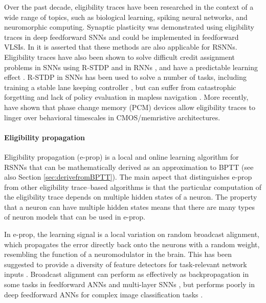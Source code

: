 Over the past decade, eligibility traces have been researched in the context of a wide range of topics, such as biological learning, spiking neural networks, and neuromorphic computing.
Synaptic plasticity was demonstrated using eligibility traces in deep feedforward SNNs \citep{zenke2018superspike,neftci2017event,kaiser2020synaptic} and could be implemented in feedforward VLSIs.
In \citet{zenke2018superspike} it is asserted that these methods are also applicable for RSNNs.
Eligibility traces have also been shown to solve difficult credit assignment problems in SNNs using R-STDP \citep{legenstein2008learning, bellec2020solution} and in RNNs \citep{he2015distinct}, and have a predictable learning effect \citep{legenstein2008learning}.
R-STDP in SNNs has been used to solve a number of tasks, including training a stable lane keeping controller \citep{bing2020indirect}, but can suffer from catastrophic forgetting and lack of policy evaluation in mapless navigation \citep{bing2018end}.
More recently, \citet{demirag2021pcm} have shown that phase change memory (PCM) devices allow eligibility traces to linger over behavioral timescales in CMOS/memristive architectures.

\paragraph{Eligibility propagation}
Eligibility propagation (e-prop) \citep{bellec2020solution} is a local and online learning algorithm for RSNNs that can be mathematically derived as an approximation to BPTT (see also Section \ref{sec:derivefromBPTT}).
The main aspect that distinguishes e-prop from other eligibility trace--based algorithms is that the particular computation of the eligibility trace depends on multiple hidden states of a neuron.
The property that a neuron can have multiple hidden states means that there are many types of neuron models that can be used in e-prop.

In e-prop, the learning signal is a local variation on random broadcast alignment, which propagates the error directly back onto the neurons with a random weight, resembling the function of a neuromodulator in the brain.
This has been suggested to provide a diversity of feature detectors for task-relevant network inputs \citep{bellec2020solution}.
Broadcast alignment can perform as effectively as backpropagation in some tasks in feedforward ANNs \citep{lillicrap2016random,nokland2016direct} and multi-layer SNNs \citep{samadi2017deep,clopath2010connectivity}, but performs poorly in deep feedforward ANNs for complex image classification tasks \citep{bartunov2018assessing}.

